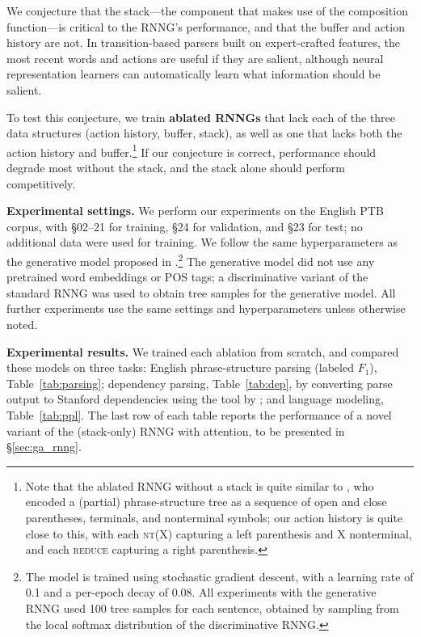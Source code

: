 \documentclass[11pt]{article}
\begin{document}
We conjecture that the stack---the component that makes use of the composition function---is critical to the RNNG's performance, and that the buffer and action history are not.  In transition-based parsers built on expert-crafted features, the most recent words and actions are useful if they are salient, although neural representation learners can automatically learn what information should be salient.

To test this conjecture, we train \textbf{ablated RNNGs} that lack each of the three data structures (action history, buffer, stack), as well as one that lacks both the action history and buffer.\footnote{Note that the ablated RNNG without a stack is quite similar to , who encoded a (partial)
 phrase-structure tree as a sequence of open and close parentheses, terminals, and nonterminal symbols; our action history is quite close to this, with each \textsc{nt}(X) capturing a left parenthesis and X nonterminal, and each \textsc{reduce} capturing a right parenthesis.}
If our conjecture is correct, performance should degrade most without the stack, and the stack alone should perform competitively.


\textbf{Experimental settings.} We perform our experiments on the English PTB corpus, with \S02--21 for training, \S24 for validation, and \S23 for test; no additional data were used for training. We follow the same hyperparameters as the generative model proposed in .\footnote{The model is trained using stochastic gradient descent, with a learning rate of 0.1 and a per-epoch decay of 0.08. All experiments with the generative RNNG used 100 tree samples for each sentence, obtained by sampling from the local softmax distribution of the discriminative RNNG.} The generative model did not use any pretrained word embeddings or POS tags; a discriminative variant of the standard RNNG was used to obtain tree samples for the generative model. All further experiments use the same settings and hyperparameters unless otherwise noted.

\textbf{Experimental results.} 
We trained each ablation from scratch, and compared these models on three tasks:  English phrase-structure parsing (labeled $F_1$), Table~\ref{tab:parsing}; dependency parsing, Table~\ref{tab:dep}, by converting parse output to Stanford dependencies \cite{demarneffe-06} using the tool by ; and language modeling, Table~\ref{tab:ppl}.  The last row of each table reports the performance of a novel variant of the (stack-only) RNNG with attention, to be presented in \S\ref{sec:ga_rnng}.
\end{document}
